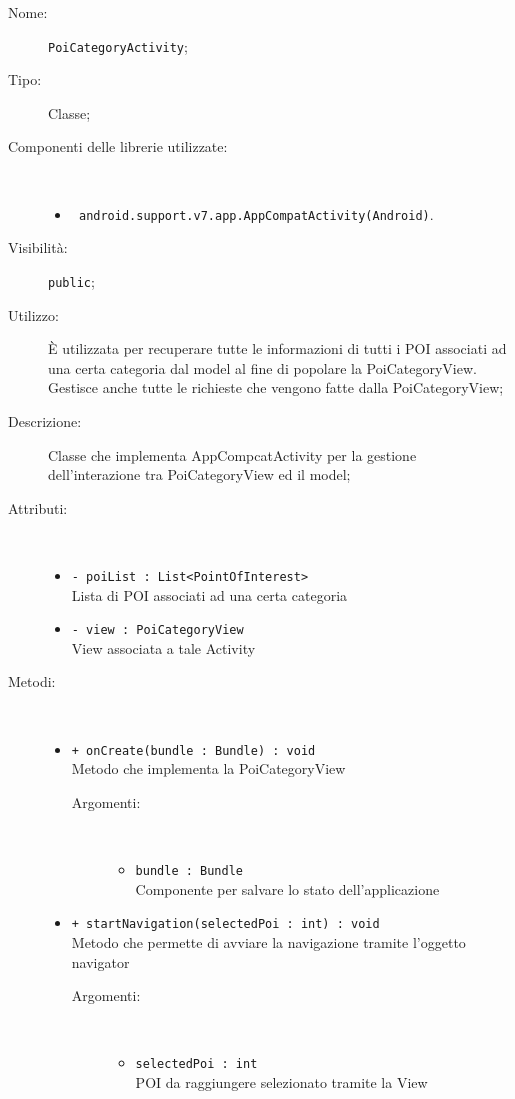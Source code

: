 \documentclass[../DefinizioneDiProdotto.tex]{subfiles}
\begin{document}
    \begin{description}
\item[Nome:] \texttt{PoiCategoryActivity};
\item[Tipo:] Classe;
\item[Componenti delle librerie utilizzate:] \
\begin{itemize}
\item \texttt{ android.support.v7.app.AppCompatActivity(Android)}.

\end{itemize}
\item[Visibilità:] \texttt{public};
\item[Utilizzo:] È utilizzata per recuperare tutte le informazioni di tutti i POI associati ad una certa categoria dal model al fine di popolare la PoiCategoryView. Gestisce anche tutte le richieste che vengono fatte dalla PoiCategoryView;
\item[Descrizione:] Classe che implementa AppCompcatActivity per la gestione dell'interazione tra PoiCategoryView ed il model;
\item[Attributi:] \
\begin{itemize}
\item \texttt{- poiList : List<PointOfInterest>}\\
Lista di POI associati ad una certa categoria

\item \texttt{- view : PoiCategoryView}\\
View associata a tale Activity

\end{itemize}
\item[Metodi:] \
\begin{itemize}
\item \texttt{+ onCreate(bundle : Bundle) : void}\\
Metodo che implementa la PoiCategoryView
 \begin{description}
\item[Argomenti:] \
\begin{itemize}
\item \texttt{bundle : Bundle}\\
Componente per salvare lo stato dell'applicazione\end{itemize}
\end{description}
\item \texttt{+ startNavigation(selectedPoi : int) : void}\\
Metodo che permette di avviare la navigazione tramite l'oggetto navigator
 \begin{description}
\item[Argomenti:] \
\begin{itemize}
\item \texttt{selectedPoi : int}\\
POI da raggiungere selezionato tramite la View\end{itemize}
\end{description}
\end{itemize}
\end{description}
\end{document}
